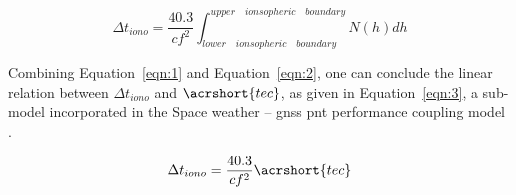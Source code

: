 \documentclass[sn-mathphys-num]{sn-jnl}%
\begin{document}
\begin{equation}
	\Delta t_{iono} = \frac{40.3}{c f^{2}} \int_{lower \quad ionsopheric \quad boundary}^{upper \quad ionsopheric \quad boundary}N(h)dh
	\label{eqn:2}
\end{equation}

Combining Equation~\ref{eqn:1} and Equation~\ref{eqn:2}, one can conclude the linear relation between $\Delta t_{iono}$ and $\acrshort{tec}$, as given in Equation~\ref{eqn:3}, a sub-model incorporated in the Space weather – \acrshort{gnss} \acrshort{pnt} performance coupling model \cite{filic2018modelling}.

\begin{equation}
	\Delta t_{iono} = \frac{40.3}{c f^{2}} \acrshort{tec}
	\label{eqn:3}
\end{equation}
\end{document}
